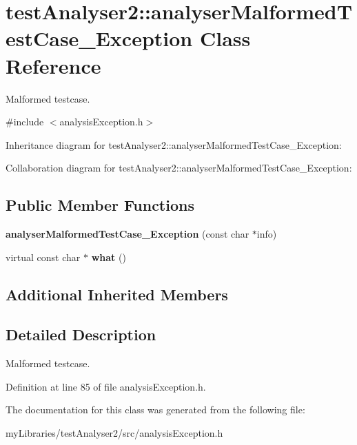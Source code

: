 \hypertarget{classtestAnalyser2_1_1analyserMalformedTestCase__Exception}{}\section{test\+Analyser2\+::analyser\+Malformed\+Test\+Case\+\_\+\+Exception Class Reference}
\label{classtestAnalyser2_1_1analyserMalformedTestCase__Exception}


Malformed testcase.  




{\ttfamily \#include $<$analysis\+Exception.\+h$>$}



Inheritance diagram for test\+Analyser2\+::analyser\+Malformed\+Test\+Case\+\_\+\+Exception\+:


Collaboration diagram for test\+Analyser2\+::analyser\+Malformed\+Test\+Case\+\_\+\+Exception\+:
\subsection*{Public Member Functions}
\begin{DoxyCompactItemize}
\item 
\mbox{\label{classtestAnalyser2_1_1analyserMalformedTestCase__Exception_aa980590f029253ca0e894d3056292bd2}} 
{\bfseries analyser\+Malformed\+Test\+Case\+\_\+\+Exception} (const char $\ast$info)
\item 
\mbox{\label{classtestAnalyser2_1_1analyserMalformedTestCase__Exception_a9a902bef8c4388e0be547a465d7ced7e}} 
virtual const char $\ast$ {\bfseries what} ()
\end{DoxyCompactItemize}
\subsection*{Additional Inherited Members}


\subsection{Detailed Description}
Malformed testcase. 

Definition at line 85 of file analysis\+Exception.\+h.



The documentation for this class was generated from the following file\+:\begin{DoxyCompactItemize}
\item 
my\+Libraries/test\+Analyser2/src/analysis\+Exception.\+h\end{DoxyCompactItemize}
